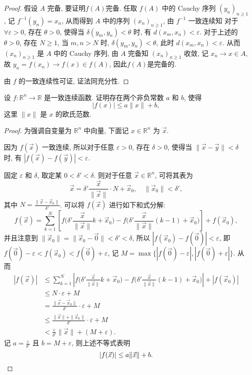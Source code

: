 \begin{proof}
    \sufficient 假设 $A$ 完备, 要证明$f(A)$完备.
    任取 $f(A)$ 中的 Cauchy 序列 $(y_n)_{n\geq 1}$, 记 $f^{-1}(y_n)=x_n $, 
    从而得到 $A$ 中的序列 $(x_n)_{n\geq 1}$, 由 $f^{-1}$ 一致连续知
    对于 $\forall\varepsilon>0$, 存在 $\theta>0$, 使得当 $\delta(y_m,y_n)<\theta$ 时,
    有 $d(x_m,x_n)<\varepsilon$.
    对于上述的 $\theta>0$, 存在 $N\geq 1$, 当 $m,n>N$ 时,
    $\delta(y_m,y_n)<\theta$, 此时 $d(x_m,x_n)<\varepsilon$.
    从而 $(x_n)_{n\geq 1}$ 是 $A$ 中的 Cauchy 序列, 
    由 $A$ 完备知 $(x_n)_{n\geq 1}$ 收敛, 记 $x_n\to x\in A$,
    故 $y_n=f(x_n)\to f(x)\in f(A)$, 因此$f(A)$是完备的.

    \necessary 由 $f$ 的一致连续性可证, 证法同充分性.
\end{proof}


\begin{exercise}
    设 $f:\mathbb{R}^n\to\mathbb{R}$ 是一致连续函数. 证明存在两个非负常数 $a$ 和 $b$, 使得
    \[|f(x)|\leq a\|x\|+b,\]
    这里 $\|x\|$ 是 $x$ 的欧氏范数.
\end{exercise}

\begin{proof}
    为强调自变量为 $\mathbb{R}^n$ 中向量, 下面记 $x\in\mathbb{R}^n$ 为 $\vec{x}$.


    因为 $f(\vec{x})$ 一致连续, 所以对于任意 $\varepsilon>0$, 存在 $\delta>0$,
    使得当 $\|\vec{x}-\vec{y}\|<\delta$ 时, 有 $|f(\vec{x})-f(\vec{y})|<\varepsilon$.

    固定 $\varepsilon$ 和 $\delta$, 取定某 $0<\delta'<\delta$.
    则对于任意 $\vec{x}\in\mathbb{R}^n$, 可将其表为
    \[\vec{x}=\delta'\frac{\vec{x}}{\|\vec{x}\|}\cdot N+\vec{x}_0,\quad\|\vec{x}_0\|<\delta',\]
    其中 $N=\frac{\|\vec{x}-\vec{x}_0\|}{\delta'}$. 可以将 $f(\vec{x})$ 进行如下和式分解:
    \[f(\vec{x})=\sum_{k=1}^N\left[f\biggl(\delta'\frac{\vec{x}}{\|\vec{x}\|}k+\vec{x}_0\biggr)-f\biggl(\delta'\frac{\vec{x}}{\|\vec{x}\|}(k-1)+\vec{x}_0\biggr)\right]+f(\vec{x}_0),\]
    并且注意到 $\|\vec{x}_0\|=\|\vec{x}_0-\vec{0}\|<\delta'<\delta$, 所以 $|f(\vec{x}_0)-f(\vec{0})|<\varepsilon$, 
    即 $f(\vec{0})-\varepsilon<f(\vec{x}_0)<f(\vec{0})+\varepsilon$, 记 $M=\max\{|f(\vec{0})-\varepsilon|,|f(\vec{0})+\varepsilon|\}$.
    从而
    \begin{align*}
        |f(\vec{x})|
        &\leq\sum_{k=1}^N \left\lvert f\biggl(\delta'\frac{\vec{x}}{\|\vec{x}\|}k+\vec{x}_0\biggr)-f\biggl(\delta'\frac{\vec{x}}{\|\vec{x}\|}(k-1)+\vec{x}_0\biggr)\right\rvert+|f(\vec{x}_0)| \\
        &\leq N\cdot\varepsilon+M \\
        &=\frac{\|\vec{x}-\vec{x}_0\|}{\delta'}\cdot\varepsilon+M \\
        &\leq\frac{\|\vec{x}\|+\|\vec{x}_0\|}{\delta'}\cdot\varepsilon+M \\
        &<\frac{\varepsilon}{\delta'}\|\vec{x}\|+(M+\varepsilon).
    \end{align*}
    记 $a=\frac{\varepsilon}{\delta'}$ 且 $b=M+\varepsilon$, 则上述不等式表明
    \[|f(\vec{x})|\leq a\|\vec{x}\|+b.\qedhere\]
\end{proof}


